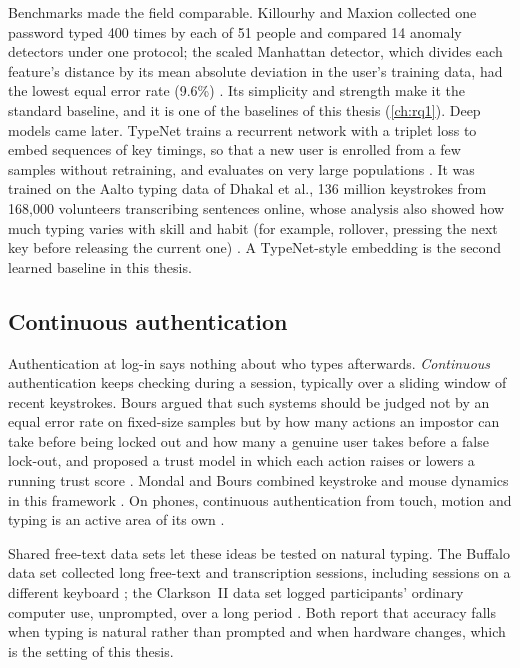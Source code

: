 Benchmarks made the field comparable. Killourhy and Maxion collected one
password typed 400 times by each of 51 people and compared 14 anomaly
detectors under one protocol; the scaled Manhattan detector, which divides
each feature's distance by its mean absolute deviation in the user's
training data, had the lowest equal error rate (9.6\%)
\cite{killourhy2009comparing}. Its simplicity and strength make it the
standard baseline, and it is one of the baselines of this thesis
(\cref{ch:rq1}). Deep models came later. TypeNet trains a recurrent network
with a triplet loss to embed sequences of key timings, so that a new user is
enrolled from a few samples without retraining, and evaluates on very large
populations \cite{acien2022typenet}. It was trained on the Aalto typing data of
Dhakal et al., 136 million keystrokes from 168,000 volunteers transcribing
sentences online, whose analysis also showed how much typing varies with
skill and habit (for example, rollover, pressing the next key before releasing
the current one) \cite{dhakal2018typing}. A TypeNet-style embedding is the
second learned baseline in this thesis.

\subsection{Continuous authentication}
Authentication at log-in says nothing about who types afterwards.
\emph{Continuous} authentication keeps checking during a session, typically
over a sliding window of recent keystrokes. Bours argued that such systems
should be judged not by an equal error rate on fixed-size samples but by how
many actions an impostor can take before being locked out and how many a
genuine user takes before a false lock-out, and proposed a trust model in
which each action raises or lowers a running trust score
\cite{bours2012continuous}. Mondal and Bours combined keystroke and mouse
dynamics in this framework \cite{mondal2017continuous}. On phones, continuous
authentication from touch, motion and typing is an active area of its own
\cite{patel2016continuous}.

Shared free-text data sets let these ideas be tested on natural typing. The
Buffalo data set collected long free-text and transcription sessions,
including sessions on a different keyboard \cite{sun2016buffalo}; the
Clarkson~II data set logged participants' ordinary computer use, unprompted,
over a long period \cite{murphy2017clarkson}. Both report that accuracy falls
when typing is natural rather than prompted and when hardware changes, which
is the setting of this thesis.

